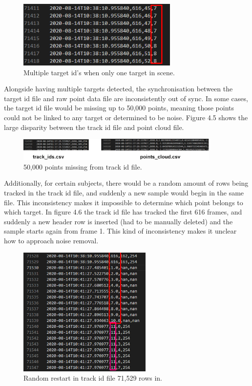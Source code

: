 \begin{figure}[H]
    \centering
    \includegraphics[width=300px, keepaspectratio=true]{multiple_targets.png}
    \caption{Multiple target id's when only one target in scene.}
    \label{fig:my_label}
\end{figure}

Alongside having multiple targets detected, the synchronisation between the target id file and raw point data file are inconsistently out of sync. In some cases, the target id file would be missing up to 50,000 points, meaning those points could not be linked to any target or determined to be noise. Figure 4.5 shows the large disparity between the track id file and point cloud file.

\begin{figure}[H]
    \centering
    \includegraphics[width=380px, keepaspectratio=true]{badsync.png}
    \caption{50,000 points missing from track id file.}
    \label{fig:my_label}
\end{figure}

Additionally, for certain subjects, there would be a random amount of rows being tracked in the track id file, and suddenly a new sample would begin in the same file. This inconsistency makes it impossible to determine which point belongs to which target. In figure 4.6 the track id file has tracked the first 616 frames, and suddenly a new header row is inserted (had to be manually deleted) and the sample starts again from frame 1. This kind of inconsistency makes it unclear how to approach noise removal.  

\begin{figure}[H]
    \centering
    \includegraphics[width=250px, keepaspectratio=true]{junkrows.png}
    \caption{Random restart in track id file 71,529 rows in.}
    \label{fig:my_label}
\end{figure}

